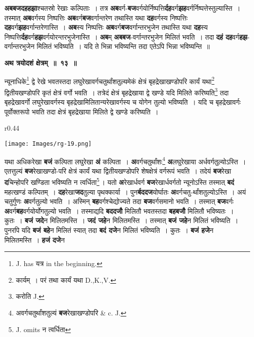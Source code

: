 \documentclass[11pt, openany]{book}
\begin{document}
\textbf{अबबजदहहझा}श्चतस्रो रेखाः कल्पिताः~। तत्र \textbf{अब}वर्ग-\textbf{बज}वर्गयोर्निष्पत्ति\textbf{र्दह}वर्ग\textbf{झह}वर्गर्निष्पत्तेस्तुल्यास्ति~। तस्मात् \textbf{अब}वर्गस्य निष्पत्तिः \textbf{अब}वर्ग\textbf{बज}वर्गान्तरेण तथास्ति यथा \textbf{दह}वर्गस्य निष्पत्तिः \textbf{दह}वर्ग\textbf{झह}वर्गान्तरेणास्ति~। \textbf{अब}स्य निष्पत्तिः \textbf{अब}वर्ग\textbf{बज}वर्गान्तरभुजेन तथास्ति यथा \textbf{दह}स्य निष्पत्ति\textbf{र्दह}वर्ग\textbf{हझ}वर्गयोरन्तरभुजेनास्ति~। \textbf{अब}म् \textbf{अबबज}-वर्गान्तरभुजेन मिलितं भवति~। तदा \textbf{दहं दह}वर्ग\textbf{हझ}-वर्गान्तरभुजेन मिलितं भविष्यति~। यदि ते भिन्ना भविष्यन्ति तदा एतेऽपि भिन्ना भविष्यन्ति~॥ 

\newpage
 \begin{center}
\textbf{\large अथ त्रयोदशं क्षेत्रम्~॥~१३~॥}
\end{center}
\vspace{2mm}

{\ab न्यूनाधिके\renewcommand{\thefootnote}{१}\footnote{{\en J. has} यत्र {\en in the beginning.}} द्वे रेखे भवतस्तदा लघुरेखावर्गचतुर्थांशतुल्यमेकं क्षेत्रं बृहद्रेखाखण्डोपरि कार्यं यथा\renewcommand{\thefootnote}{२}\footnote{कार्यम्~। परं तथा कार्यं यथा {\en D.,K.,V.}} द्वितीयखण्डोपरि कृतं क्षेत्रं वर्गो भवति~। तत्रेदं क्षेत्रं बृहद्रेखाया द्वे खण्डे यदि मिलिते करिष्यति\renewcommand{\thefootnote}{३}\footnote{करोति {\en J.}} तदा बृहद्रेखावर्गो लघुरेखावर्गस्य 
बृहद्रेखामिलितान्यरेखावर्गस्य च योगेन तुल्यो भविष्यति~। यदि च बृहद्रेखावर्गः पूर्वोक्तरूपो भवति तदा क्षेत्रं बृहद्रेखाया मिलिते द्वे खण्डे करिष्यति~।}\\ 

\begin{wrapfigure}{r}{0.44\textwidth}
\vspace{-6mm}
\begin{center}
\texttt{[image: Images/rg-19.png]}
\end{center}
\vspace{-8mm}
\end{wrapfigure}

 यथा अधिकरेखा \textbf{बजं} कल्पिता लघुरेखा \textbf{अं} कल्पिता~। \textbf{अ}वर्गचतुर्थांशः\renewcommand{\thefootnote}{४}\footnote{अवर्गचतुर्थांशतुल्यं \textbf{बज}रेखाखण्डोपरि {\en \& c. J.}} \textbf{अ}लघुरेखाया अर्धवर्गतुल्योऽस्ति~। एतत्तुल्यं \textbf{बज}रेखाखण्डो-परि क्षेत्रं कार्यं यथा द्वितीयखण्डोपरि शेषक्षेत्रं वर्गरूपं भवति~। तदेयं \textbf{बज}रेखा \textbf{द}चिन्होपरि खण्डिता भविष्यति न त्वर्धिता\renewcommand{\thefootnote}{५}\footnote{{\en J. omits} न त्वर्धिता}\,। यतो \textbf{अ}रेखार्धवर्ग \textbf{बज}रेखार्धवर्गतो न्यूनोऽस्ति तस्मात् \textbf{बदं} महत्खण्डं कल्पितम्~। \textbf{दह}रेखा\textbf{जद}तुल्या पृथक्कार्या~। पुन\textbf{र्बददज}योर्घातः \textbf{अ}वर्गचतु-र्थांशतुल्योऽस्ति~। अयं चतुर्गुणः \textbf{अ}वर्गतुल्यो भवति~। अस्मिन् \textbf{बह}वर्गश्चेद्योज्यते तदा \textbf{बज}वर्गसमानो भवति~। तस्मात्  \textbf{बज}वर्गः \textbf{अ}वर्ग\textbf{बह}वर्गयोर्योगतुल्यो भवति~। तस्माद्यदि \textbf{बददजौ} मिलितौ भवतस्तदा \textbf{बहबजौ} मिलितौ भविष्यतः~। कुतः~। \textbf{बजं जदे}न मिलितमस्ति~। \textbf{जदं जहे}न मिलितमस्ति~। तस्मात् \textbf{बजं जहे}न मिलितं भविष्यति~। पुनरपि यदि \textbf{बजं बहे}न मिलितं स्यात् तदा \textbf{बदं दजे}न मिलितं भविष्यति~। कुतः~। \textbf{बजं हजे}न मिलितमस्ति~। \textbf{हजं दजे}न 
\end{document}
